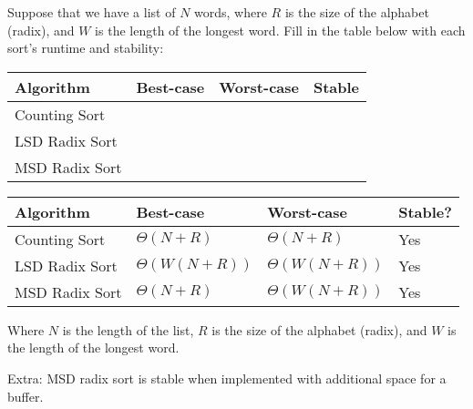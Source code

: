\ifprintanswers\else

Suppose that we have a list of $N$ words, where $R$ is the size of the alphabet (radix), and $W$ is the length of the longest word. Fill in the table below with each sort's runtime and stability:

{
\renewcommand{\arraystretch}{2}
\setlength{\tabcolsep}{12pt}
\begin{tabularx}{\textwidth}{Xlll}
Algorithm         & Best-case       & Worst-case          & Stable \\\hline
Counting Sort     &                 &                     &        \\
LSD Radix Sort    &                 &                     &        \\
MSD Radix Sort    &                 &                     &
\end{tabularx}
}
\fi

\begin{solution}
{
\renewcommand{\arraystretch}{2}
\setlength{\tabcolsep}{12pt}
\begin{tabularx}{\textwidth}{Xlll}
Algorithm         & Best-case          & Worst-case          & Stable? \\\hline
Counting Sort     & $\Theta(N + R)$    & $\Theta(N + R)$     & Yes    \\
LSD Radix Sort    & $\Theta(W(N + R))$ & $\Theta(W(N + R))$  & Yes    \\
MSD Radix Sort    & $\Theta(N + R)$    & $\Theta(W(N + R))$  & Yes
\end{tabularx}
}

Where $N$ is the length of the list, $R$ is the size of the alphabet (radix),
and $W$ is the length of the longest word.

Extra: MSD radix sort is stable when implemented with additional space for a buffer.
\end{solution}
